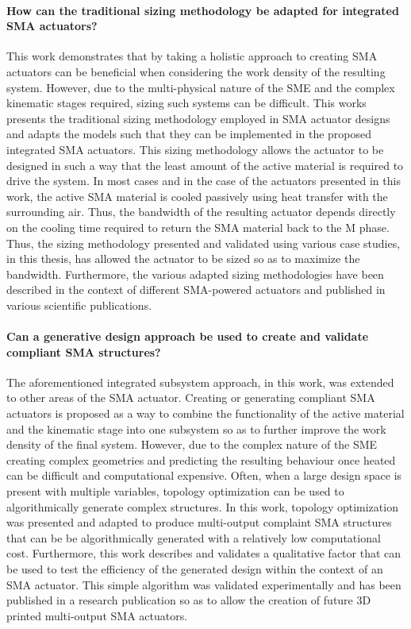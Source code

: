 \paragraph{How can the traditional sizing methodology be adapted for integrated SMA actuators?}
This work demonstrates that by taking a holistic approach to creating SMA actuators can be beneficial when considering the work density of the resulting system. However, due to the multi-physical nature of the SME and the complex kinematic stages required, sizing such systems can be difficult. This works presents the traditional sizing methodology employed in SMA actuator designs and adapts the models such that they can be implemented in the proposed integrated SMA actuators. This sizing methodology allows the actuator to be designed in such a way that the least amount of the active material is required to drive the system. In most cases and in the case of the actuators presented in this work, the active SMA material is cooled passively using heat transfer with the surrounding air. Thus, the bandwidth of the resulting actuator depends directly on the cooling time required to return the SMA material back to the M phase. Thus, the sizing methodology presented and validated using various case studies, in this thesis, has allowed the actuator to be sized so as to maximize the bandwidth. Furthermore, the various adapted sizing methodologies have been described in the context of different SMA-powered actuators and published in various scientific publications.

\paragraph{Can a generative design approach be used to create and validate compliant SMA structures?}
The aforementioned integrated subsystem approach, in this work, was extended to other areas of the SMA actuator. Creating or generating compliant SMA actuators is proposed as a way to combine the functionality of the active material and the kinematic stage into one subsystem so as to further improve the work density of the final system. However, due to the complex nature of the SME creating complex geometries and predicting the resulting behaviour once heated can be difficult and computational expensive. Often, when a large design space is present with multiple variables, topology optimization can be used to algorithmically generate complex structures. In this work, topology optimization was presented and adapted to produce multi-output complaint SMA structures that can be be algorithmically generated with a relatively low computational cost. Furthermore, this work describes and validates a qualitative factor that can be used to test the efficiency of the generated design within the context of an SMA actuator. This simple algorithm was validated experimentally and has been published in a research publication so as to allow the creation of future 3D printed multi-output SMA actuators.

